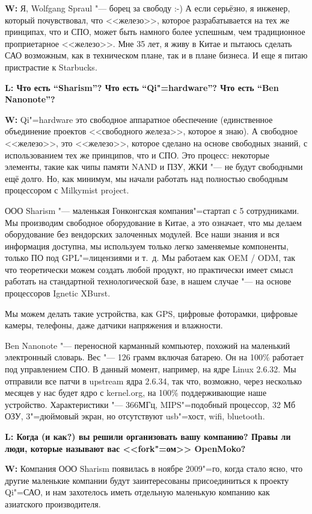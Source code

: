 \documentclass[10pt, a5paper]{article}
\begin{document}
{\noindent \bf W:} Я, Wolfgang Spraul "--- борец за свободу :-) А если серьёзно, я инженер, который почувствовал, что <<железо>>, которое разрабатывается на тех же принципах, что и СПО, может быть намного более успешным, чем традиционное проприетарное <<железо>>. Мне 35 лет, я живу в Китае и пытаюсь сделать САО возможным, как в техническом плане, так и в плане бизнеса. И еще я питаю пристрастие к Starbucks.

{\noindent \bf L: Что есть “Sharism”? Что есть “Qi"=hardware”? Что есть “Ben Nanonote”?}

{\noindent \bf W:} Qi"=hardware это свободное аппаратное обеспечение (единственное объединение проектов <<свободного железа>>, которое я знаю). А свободное <<железо>>, это <<железо>>, которое сделано на основе свободных знаний, с использованием тех же принципов, что и СПО. Это процесс: некоторые элементы, такие как чипы памяти NAND и ПЗУ, ЖКИ "--- не будут свободными ещё долго. Но, как минимум, мы начали работать над полностью свободным процессором с Milkymist project.

ООО Sharism "--- маленькая Гонконгская компания"=стартап с 5 сотрудниками. Мы производим свободное оборудование в Китае, а это означает, что мы делаем оборудование без вендорских залоченных модулей. Все наши знания и вся информация доступна, мы используем только легко заменяемые компоненты, только ПО под GPL"=лицензиями и т.~д. Мы работаем как OEM / ODM, так что теоретически можем создать любой продукт, но практически имеет смысл работать на стандартной технологической базе, в нашем случае "--- на основе процессоров Ignetic XBurst.

Мы можем делать такие устройства, как GPS, цифровые фоторамки, цифровые камеры, телефоны, даже датчики напряжения и влажности.

Ben Nanonote "--- переносной карманный компьютер, похожий на маленький электронный словарь. Вес "--- 126 грамм включая батарею. Он на 100\% работает под управлением СПО. В данный момент, например, на ядре Linux 2.6.32. Мы отправили все патчи в upstream ядра 2.6.34, так что, возможно, через несколько месяцев у нас будет ядро с kernel.org, на 100\% поддерживающие наше устройство. Характеристики "--- 366МГц, MIPS"=подобный процессор, 32 Мб ОЗУ, 3"=дюймовый экран, но отсутствуют usb"=хост, wifi, bluetooth.

{\noindent \bf L: Когда (и как?) вы решили организовать вашу компанию? Правы ли люди, которые называют вас <<fork"=ом>> OpenMoko?}

{\noindent \bf W:} Компания ООО Sharism появилась в ноябре 2009"=го, когда стало ясно, что другие маленькие компании будут заинтересованы присоединиться к проекту Qi"=САО, и нам захотелось иметь отдельную маленькую компанию как азиатского производителя.
\end{document}
